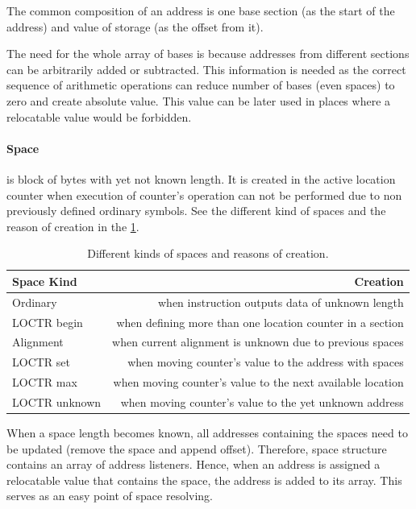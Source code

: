The common composition of an address is one base section (as the start of the address) and value of storage (as the offset from it).

The need for the whole array of bases is because addresses from different sections can be arbitrarily added or subtracted. This information is needed as the correct sequence of arithmetic operations can reduce number of bases (even spaces) to zero and create absolute value. This value can be later used in places where a relocatable value would be forbidden.

\paragraph*{Space} is block of bytes with yet not known length. It is created in the active location counter when execution of counter's operation can not be performed due to non previously defined ordinary symbols. See the different kind of spaces and the reason of creation in  the \cref{tab06:space}.

\begin{table}
	\centering
	\begin{tabular}{lr}
		\textbf{Space Kind} &                                          \textbf{Creation} \\ \toprule
		Ordinary            &            when instruction outputs data of unknown length \\
		LOCTR begin         &  when defining more than one location counter in a section \\
		Alignment           &   when current alignment is unknown due to previous spaces \\
		LOCTR set           &     when moving counter's value to the address with spaces \\
		LOCTR max           & when moving counter's value to the next available location \\
		LOCTR unknown       &     when moving counter's value to the yet unknown address \\ \bottomrule
	\end{tabular}
	\caption{Different kinds of spaces and reasons of creation.}
	\label{tab06:space}
\end{table}


When a space length becomes known, all addresses containing the spaces need to be updated (remove the space and append offset). Therefore, space structure contains an array of address listeners. Hence, when an address is assigned a relocatable value that contains the space, the address is added to its array. This serves as an easy point of space resolving.


